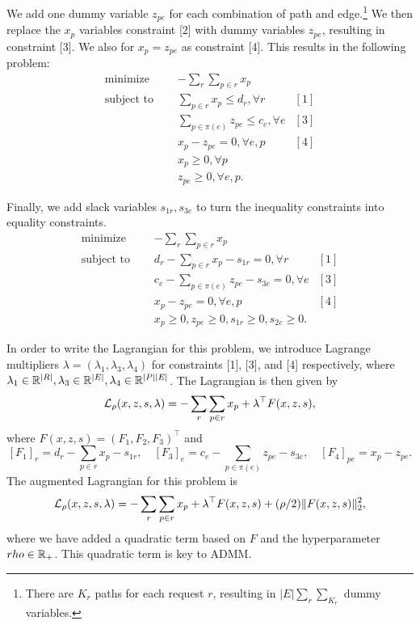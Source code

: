 \documentclass[11pt]{article}
\begin{document}
We add one dummy variable $z_{pe}$ for each combination of path and edge.\footnote{
There are $K_r$ paths for each request $r$, resulting in
$|E|\sum_r\sum_{K_r}$ dummy variables.}
We then replace the $x_p$ variables constraint [2] with dummy variables $z_{pe}$,
resulting in constraint [3].
We also for $x_p = z_{pe}$ as constraint [4].
This results in the following problem:
\begin{equation}
\label{eqn:network-opt-sep}
\begin{aligned}
\textrm{minimize } \quad & -\sum_r \sum_{p\in r} x_p\\
\textrm{subject to } \quad
&\sum_{p \in r}x_p \le d_r, \forall r & [1]\\
&\sum_{p\in\pi(e)} z_{pe} \le c_e, \forall e & [3]\\
&x_p - z_{pe} = 0, \forall e,p & [4]\\
& x_p \geq 0, \forall p \\
& z_{pe} \geq 0, \forall e,p.
\end{aligned}
\end{equation}

Finally, we add slack variables $s_{1r},s_{3e}$
to turn the inequality constraints into equality constraints.
\begin{equation}
\label{eqn:network-opt-sep-eq}
\begin{aligned}
\textrm{minimize } \quad & -\sum_r \sum_{p\in r} x_p\\
\textrm{subject to } \quad
&d_r - \sum_{p \in r}x_p - s_{1r} = 0, \forall r & [1]\\
&c_e - \sum_{p\in\pi(e)} z_{pe} - s_{3e}= 0, \forall e & [3]\\
&x_p - z_{pe} = 0, \forall e,p & [4]\\
& x_p \geq 0,
z_{pe} \geq 0,
s_{1r} \geq 0,
s_{2e} \geq 0.
\end{aligned}
\end{equation}

In order to write the Lagrangian for this problem,
we introduce Lagrange multipliers
$\lambda = (\lambda_{1},\lambda_{3},\lambda_{4})$
for constraints [1], [3], and [4] respectively,
where $\lambda_1\in\mathbb{R}^{|R|},\lambda_3\in\mathbb{R}^{|E|},\lambda_4\in\mathbb{R}^{|P||E|}$.
The Lagrangian is then given by
\begin{equation}
    \label{eqn:network-lagrangian-std}
    \mathcal{L}_\rho(x,z,s,\lambda) =-\sum_r\sum_{p\in r} x_p + \lambda^\top F(x,z,s),
\end{equation}
where $F(x,z,s) = (F_1, F_2,F_3)^\top$ and
$$
[F_1]_r = d_r - \sum_{p \in r}x_p - s_{1r},\quad
[F_3]_e = c_e - \sum_{p\in\pi(e)} z_{pe} - s_{3e},\quad
[F_4]_{pe} = x_p - z_{pe}.
$$
The augmented Lagrangian for this problem is
\begin{equation}
    \label{eqn:network-lagrangian}
    \mathcal{L}_\rho(x,z,s,\lambda) =-\sum_r\sum_{p\in r} x_p + \lambda^\top F(x,z,s)
        + (\rho/2)\| F(x,z,s) \|_2^2,
\end{equation}
where we have added a quadratic term based on $F$ and the hyperparameter $rho\in\mathbb{R}_+$.
This quadratic term is key to ADMM.
\end{document}
